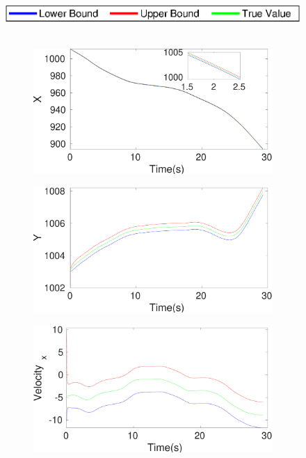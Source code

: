 \begin{figure}[h]
\includegraphics[scale=0.8]{figures/legend}\\\\
\begin{subfigure}{.5\linewidth}
\centering
\includegraphics[width=\linewidth]{figures/Frad/s3cvSMX}
\end{subfigure}
\begin{subfigure}{.5\linewidth}
\centering
\includegraphics[width=\linewidth]{figures/Frad/s3cvSMY}
\end{subfigure}
\begin{subfigure}{.5\linewidth}
\centering
\includegraphics[width=\linewidth]{figures/Frad/s3cvSMVelocity_x}

\end{subfigure}
\end{figure}
